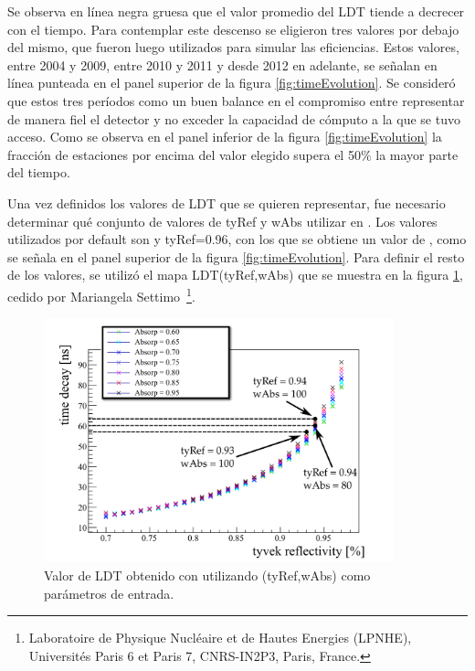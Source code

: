 	Se observa en línea negra gruesa que el valor promedio del LDT tiende a decrecer con el tiempo.
	Para contemplar este descenso se eligieron tres valores por debajo del mismo, que fueron luego utilizados para simular las eficiencias.
	Estos valores,  entre 2004 y 2009,  entre 2010 y 2011 y  desde 2012 en adelante, se señalan en línea punteada en el panel superior de la figura \ref{fig:timeEvolution}.
	Se consideró que estos tres períodos como un buen balance en el compromiso entre representar de manera fiel el detector y no exceder la capacidad de cómputo a la que se tuvo acceso.
	Como se observa en el panel inferior de la figura \ref{fig:timeEvolution} la fracción de estaciones por encima del valor elegido supera el 50$\%$ la mayor parte del tiempo.
	
	Una vez definidos los valores de LDT que se quieren representar, fue necesario determinar qué conjunto de valores de tyRef y wAbs utilizar en \Offline{}.
	Los valores utilizados por default son  y tyRef=0.96, con los que se obtiene un valor de , como se señala en el panel superior de la figura \ref{fig:timeEvolution}.
	Para definir el resto de los valores, se utilizó el mapa LDT(tyRef,wAbs) que se muestra en la figura \ref{fig:timedecay_vs_reflect_absorp}, cedido por Mariangela Settimo~\footnote{ Laboratoire de Physique Nucléaire et de Hautes Energies (LPNHE), Universités Paris 6 et Paris 7, CNRS-IN2P3, Paris, France.}.
	\begin{figure}[ht!]
		\begin{center}
			\includegraphics[width=0.9\textwidth]{fig/resultadosAuger/timedecay_vs_reflect_absorp_2}
			\caption{Valor de LDT obtenido con \Offline{} utilizando (tyRef,wAbs) como parámetros de entrada.}
			\label{fig:timedecay_vs_reflect_absorp}
		\end{center}
	\end{figure}
